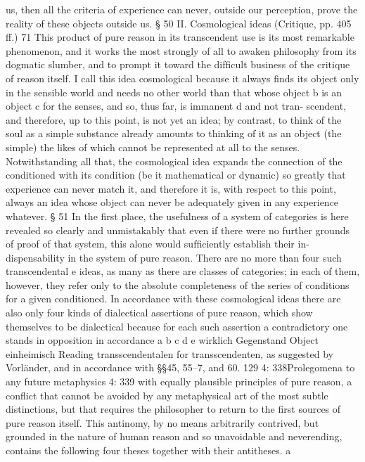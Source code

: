 us, then all the criteria of experience can never, outside our perception,
prove the reality of these objects outside us.
§ 50
II. Cosmological ideas (Critique, pp. 405 ff.) 71
This product of pure reason in its transcendent use is its most remarkable
phenomenon, and it works the most strongly of all to awaken philosophy
from its dogmatic slumber, and to prompt it toward the difﬁcult business
of the critique of reason itself.
I call this idea cosmological because it always ﬁnds its object only in
the sensible world and needs no other world than that whose object b is
an object c for the senses, and so, thus far, is immanent d and not tran-
scendent, and therefore, up to this point, is not yet an idea; by contrast,
to think of the soul as a simple substance already amounts to thinking of
it as an object (the simple) the likes of which cannot be represented at all
to the senses. Notwithstanding all that, the cosmological idea expands
the connection of the conditioned with its condition (be it mathematical
or dynamic) so greatly that experience can never match it, and therefore
it is, with respect to this point, always an idea whose object can never be
adequately given in any experience whatever.
§ 51
In the ﬁrst place, the usefulness of a system of categories is here revealed
so clearly and unmistakably that even if there were no further grounds
of proof of that system, this alone would sufﬁciently establish their in-
dispensability in the system of pure reason. There are no more than four
such transcendental e ideas, as many as there are classes of categories; in
each of them, however, they refer only to the absolute completeness of
the series of conditions for a given conditioned. In accordance with these
cosmological ideas there are also only four kinds of dialectical assertions
of pure reason, which show themselves to be dialectical because for each
such assertion a contradictory one stands in opposition in accordance
a
b
c
d
e
wirklich
Gegenstand
Object
einheimisch
Reading transscendentalen for transscendenten, as suggested by Vorländer, and in accordance
with §§45, 55–7, and 60.
129
4: 338Prolegomena to any future metaphysics
4: 339
with equally plausible principles of pure reason, a conﬂict that cannot
be avoided by any metaphysical art of the most subtle distinctions, but
that requires the philosopher to return to the ﬁrst sources of pure reason
itself. This antinomy, by no means arbitrarily contrived, but grounded
in the nature of human reason and so unavoidable and neverending,
contains the following four theses together with their antitheses. a
